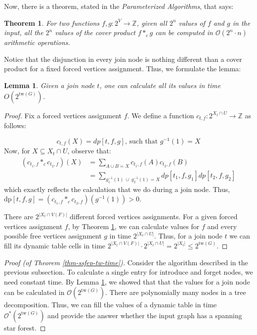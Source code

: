 \documentclass[en]{pracamgr}
\newtheorem{theorem}{Theorem}
\newtheorem{lemma}{Lemma}
\newcommand{\ssf}{spanning star forest}
\newcommand{\dpt}[1]{\textrm{dp}[#1]}
\newcommand{\tw}{\textrm{tw}}
\begin{document}
Now, there is a theorem, stated in the \textit{Parameterized Algorithms}, that says:

\begin{theorem}\label{cproduct}
	For two functions $f,g:2^V \rightarrow \mathbb{Z}$, given all $2^n$ values of $f$ and $g$ in the input, all the $2^n$ values of the cover product $f*_cg$ can be computed in $\mathcal{O}(2^n\cdot n)$ arithmetic operations.
\end{theorem}

Notice that the disjunction in every join node is nothing different than a cover product for a fixed forced vertices assignment. Thus, we formulate the lemma:

\begin{lemma}\label{join lemma}
	Given a join node $t$, one can calculate all its values in time $O(2^{\tw(G)})$.
\end{lemma}

\begin{proof}
	Fix a forced vertices assignment $f$. We define a function $c_{t,f}:2^{X_t \cap U} \rightarrow \mathbb{Z}$ as follows:
	
	\begin{equation*}
		c_{t,f}(X) = dp[t,f,g] \text{, such that $g^{-1}(1) = X$}
	\end{equation*}	
	Now, for $X \subseteq X_t \cap U$, observe that: 
	\begin{align*}
		(c_{t_1,f} *_c c_{t_2,f})(X) &= \sum\limits_{A \cup B = X} c_{t_1,f}(A)c_{t_2,f}(B) \\
		&= \sum\limits_{ g_1^{-1}(1)\ \cup\ g_2^{-1}(1) = X} dp[t_1,f,g_1]dp[t_2,f,g_2]	
	\end{align*}
	which exactly reflects the calculation that we do during a join node. Thus, $\dpt{t,f,g} = (c_{t_1,f} *_c c_{t_2,f})(g^{-1}(1)) > 0$. 
	
	There are $2^{|X_t \cap V(F)|}$ different forced vertices assignments. For a given forced vertices assignment $f$, by Theorem \ref{cproduct}, we can calculate values for $f$ and every possible free vertices assignment $g$ in time $2^{|X_t \cap U|}$. Thus, for a join node $t$ we can fill its dynamic table cells in time $2^{|X_t \cap V(F)|} \cdot 2^{|X_t \cap U|} = 2^{|X_t|} \leq 2^{\tw(G)}$.
\end{proof}

\begin{proof}[Proof (of Theorem \ref{thm-ssfep-tw-time})]
	Consider the algorithm described in the previous subsection. To calculate a single entry for introduce and forget nodes, we need constant time. By Lemma \ref{join lemma}, we showed that that the values for a join node can be calculated in $\mathcal{O}(2^{\tw(G)})$. There are polynomially many nodes in a tree decomposition. Thus, we can fill the values of a dynamic table in time $\mathcal{O}^*(2^{\tw(G)})$ and provide the answer whether the input graph has a \ssf{}.
\end{proof}
\end{document}
